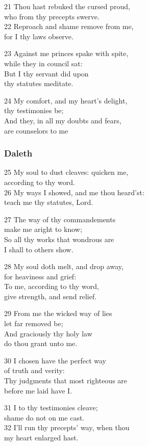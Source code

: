 \begin{multicols}{3}
21 Thou hast rebuked the cursed proud,\\
who from thy precepts swerve.\\
22 Reproach and shame remove from me,\\
for I thy laws observe.

23 Against me princes spake with spite,\\
while they in council sat:\\
But I thy servant did upon\\
thy statutes meditate.

24 My comfort, and my heart’s delight,\\
thy testimonies be;\\
And they, in all my doubts and fears,\\
are counselors to me

\subsubsection*{Daleth}

25 My soul to dust cleaves: quicken me,\\
according to thy word.\\
26 My ways I showed, and me thou heard’st:\\
teach me thy statutes, Lord.

27 The way of thy commandements\\
make me aright to know;\\
So all thy works that wondrous are\\
I shall to others show.

28 My soul doth melt, and drop away,\\
for heaviness and grief:\\
To me, according to thy word,\\
give strength, and send relief.

29 From me the wicked way of lies\\
let far removed be;\\
And graciously thy holy law\\
do thou grant unto me.

30 I chosen have the perfect way\\
of truth and verity:\\
Thy judgments that most righteous are\\
before me laid have I.

31 I to thy testimonies cleave;\\
shame do not on me cast.\\
32 I’ll run thy precepts’ way, when thou\\
my heart enlarged hast.


\end{multicols}
